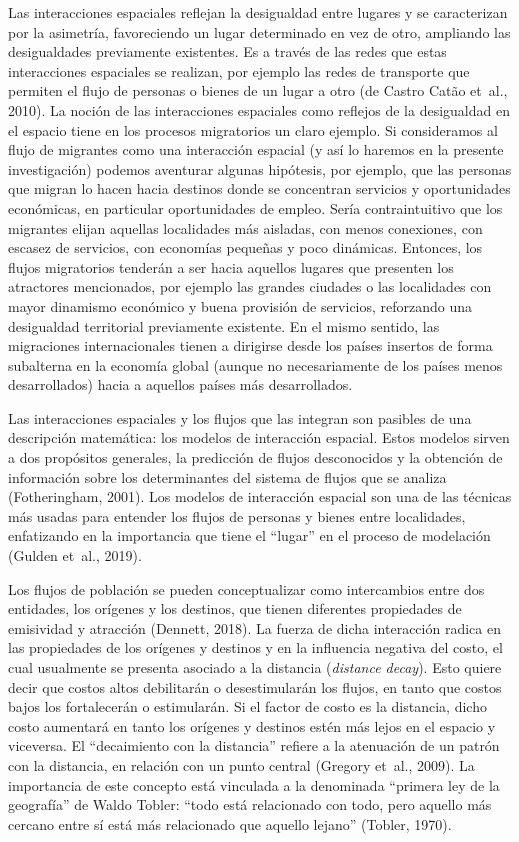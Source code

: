 \documentclass[12pt,spanish,]{article}
\begin{document}
Las interacciones espaciales reflejan la desigualdad entre lugares y se
caracterizan por la asimetría, favoreciendo un lugar determinado en vez
de otro, ampliando las desigualdades previamente existentes. Es a través
de las redes que estas interacciones espaciales se realizan, por ejemplo
las redes de transporte que permiten el flujo de personas o bienes de un
lugar a otro (de Castro Catão et~al., 2010). La noción de las
interacciones espaciales como reflejos de la desigualdad en el espacio
tiene en los procesos migratorios un claro ejemplo. Si consideramos al
flujo de migrantes como una interacción espacial (y así lo haremos en la
presente investigación) podemos aventurar algunas hipótesis, por
ejemplo, que las personas que migran lo hacen hacia destinos donde se
concentran servicios y oportunidades económicas, en particular
oportunidades de empleo. Sería contraintuitivo que los migrantes elijan
aquellas localidades más aisladas, con menos conexiones, con escasez de
servicios, con economías pequeñas y poco dinámicas. Entonces, los flujos
migratorios tenderán a ser hacia aquellos lugares que presenten los
atractores mencionados, por ejemplo las grandes ciudades o las
localidades con mayor dinamismo económico y buena provisión de
servicios, reforzando una desigualdad territorial previamente existente.
En el mismo sentido, las migraciones internacionales tienen a dirigirse
desde los países insertos de forma subalterna en la economía global
(aunque no necesariamente de los países menos desarrollados) hacia a
aquellos países más desarrollados.

Las interacciones espaciales y los flujos que las integran son pasibles
de una descripción matemática: los modelos de interacción espacial.
Estos modelos sirven a dos propósitos generales, la predicción de flujos
desconocidos y la obtención de información sobre los determinantes del
sistema de flujos que se analiza (Fotheringham, 2001). Los modelos de
interacción espacial son una de las técnicas más usadas para entender
los flujos de personas y bienes entre localidades, enfatizando en la
importancia que tiene el ``lugar'' en el proceso de modelación (Gulden
et~al., 2019).

Los flujos de población se pueden conceptualizar como intercambios entre
dos entidades, los orígenes y los destinos, que tienen diferentes
propiedades de emisividad y atracción (Dennett, 2018). La fuerza de
dicha interacción radica en las propiedades de los orígenes y destinos y
en la influencia negativa del costo, el cual usualmente se presenta
asociado a la distancia (\emph{distance decay}). Esto quiere decir que
costos altos debilitarán o desestimularán los flujos, en tanto que
costos bajos los fortalecerán o estimularán. Si el factor de costo es la
distancia, dicho costo aumentará en tanto los orígenes y destinos estén
más lejos en el espacio y viceversa. El ``decaimiento con la distancia''
refiere a la atenuación de un patrón con la distancia, en relación con
un punto central (Gregory et~al., 2009). La importancia de este concepto
está vinculada a la denominada ``primera ley de la geografía'' de Waldo
Tobler: ``todo está relacionado con todo, pero aquello más cercano entre
sí está más relacionado que aquello lejano'' (Tobler, 1970).
\end{document}
